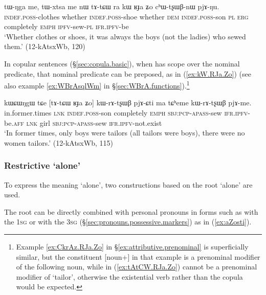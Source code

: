 \begin{exe}
\ex \label{ex:kW.RJa.Zo}
 \gll tɯ-ŋga me, tɯ-xtsa me nɯ tɤ-tɕɯ ra kɯ ʁɟa ʑo cʰɯ-tʂɯβ-nɯ pjɤ-ŋu. \\
 \textsc{indef}.\textsc{poss}-clothes whether  \textsc{indef}.\textsc{poss}-shoe whether \textsc{dem} \textsc{indef}.\textsc{poss}-son \textsc{pl} \textsc{erg} completely \textsc{emph} \textsc{ipfv}-sew-\textsc{pl} \textsc{ifr}.\textsc{ipfv}-be \\
 \glt `Whether clothes or shoes, it was always the boys (not the ladies) who sewed them.' (12-kAtsxWb, 120)
\end{exe}

In copular sentences (§\ref{sec:copula.basic}), when  has scope over the nominal predicate, that nominal predicate can be preposed, as in (\ref{ex:kW.RJa.Zo}) (see also example \ref{ex:WBrAsqlWm} in §\ref{sec:WBrA.functions}).\footnote{Example \ref{ex:CkrAz.RJa.Zo} in §\ref{ex:attributive.prenominal} is superficially similar, but the constituent [noun+]  in that example is a prenominal modifier of the following noun, while in (\ref{ex:tAtCW.RJa.Zo})  cannot be a prenominal modifier of  `tailor', otherwise the existential verb  rather than the copula  would be expected. }
  
\begin{exe}
\ex \label{ex:tAtCW.RJa.Zo}
 \gll  kɯɕɯŋgɯ tɕe [tɤ-tɕɯ ʁɟa ʑo] kɯ-rɤ-tʂɯβ pjɤ-ɕti ma tɕʰeme kɯ-rɤ-tʂɯβ pjɤ-me. \\
 in.former.times \textsc{lnk} \textsc{indef}.\textsc{poss}-son completely \textsc{emph} \textsc{sbj}:\textsc{pcp}-\textsc{apass}-sew \textsc{ifr}.\textsc{ipfv}-be.\textsc{aff} \textsc{lnk} girl \textsc{sbj}:\textsc{pcp}-\textsc{apass}-sew \textsc{ifr}.\textsc{ipfv}-not.exist \\
 \glt  `In former times, only boys were tailors (all tailors were boys), there were no women tailors.' (12-kAtsxWb, 115)
\end{exe}

\subsubsection{Restrictive `alone'} \label{sec:stWsti}
To express the meaning `alone', two constructions based on the root  `alone' are used.

The root  can be directly combined with personal pronouns in forms such as  with the \textsc{1sg}  or  with the \textsc{3sg}   (§\ref{sec:pronouns.possessive.markers}) as in (\ref{ex:aZosti}).

